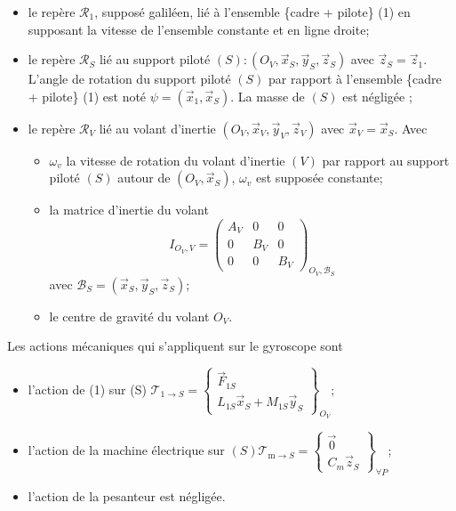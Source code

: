 \documentclass[10pt]{article}
\begin{document}
\begin{itemize}
  \item[-] le repère $\mathcal{R}_{1}$, supposé galiléen, lié à l'ensemble \{cadre + pilote\} (1) en supposant la vitesse de l'ensemble constante et en ligne droite;
  \item[-] le repère $\mathcal{R}_{S}$ lié au support piloté $(S):\left(O_{V}, \vec{x}_{S}, \vec{y}_{S}, \vec{z}_{S}\right)$ avec $\vec{z}_{S}=\vec{z}_{1}$. L'angle de rotation du support piloté $(S)$ par rapport à l'ensemble \{cadre + pilote\} (1) est noté $\psi=\left(\vec{x}_{1}, \vec{x}_{S}\right)$. La masse de $(S)$ est négligée ;
  \item[-] le repère $\mathcal{R}_{V}$ lié au volant d'inertie $\left(O_{V}, \vec{x}_{V}, \vec{y}_{V}, \vec{z}_{V}\right)$ avec $\vec{x}_{V}=\vec{x}_{S}$. Avec
  \begin{itemize}
    \item[-] $\omega_{v}$ la vitesse de rotation du volant d'inertie $(V)$ par rapport au support piloté $(S)$ autour de $\left(O_{V}, \vec{x}_{S}\right)$, $\omega_{v}$ est supposée constante;
    \item[-] la matrice d'inertie du volant
$$
I_{O_{V}, V}=\left(\begin{array}{ccc}
A_{V} & 0 & 0 \\
0 & B_{V} & 0 \\
0 & 0 & B_{V}
\end{array}\right)_{O_{V}, \mathcal{B}_{S}}
$$
avec $\mathcal{B}_{S}=\left(\vec{x}_{S}, \vec{y}_{S}, \vec{z}_{S}\right)$;
    \item[-] le centre de gravité du volant $O_{V}$.
  \end{itemize}
\end{itemize}

Les actions mécaniques qui s'appliquent sur le gyroscope sont

\begin{itemize}
  \item[-] l'action de (1) sur (S) $\mathscr{T}_{1 \rightarrow S}=\left\{\begin{array}{c}\vec{F}_{1 S} \\ L_{1 S} \vec{x}_{S}+M_{1 S} \vec{y}_{S}\end{array}\right\}_{O_{V}}$;
  \item[-] l'action de la machine électrique sur $(S) \mathscr{T}_{\mathrm{m} \rightarrow S}=\left\{\begin{array}{c}\overrightarrow{0} \\ C_{m} \vec{z}_{S}\end{array}\right\}_{\forall P}$;
  \item[-] l'action de la pesanteur est négligée.
\end{itemize}
\end{document}
